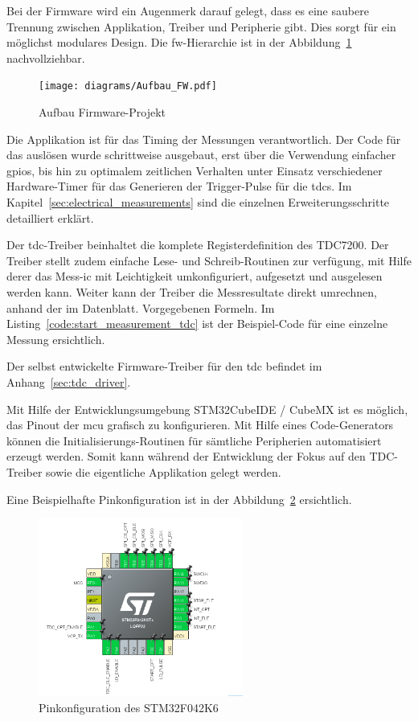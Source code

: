 Bei der Firmware wird ein Augenmerk darauf gelegt, dass es eine saubere Trennung zwischen Applikation, Treiber und
Peripherie gibt. Dies sorgt für ein möglichst modulares Design. Die \acrshort{fw}-Hierarchie ist in der
Abbildung~\ref{fig:hierarchy_firmware} nachvollziehbar.

\begin{figure}[H]
    \centering
    \texttt{[image: diagrams/Aufbau\_FW.pdf]}
    \caption{Aufbau Firmware-Projekt}\label{fig:hierarchy_firmware}
\end{figure}

Die Applikation ist für das Timing der Messungen verantwortlich. Der Code für das auslösen wurde schrittweise ausgebaut,
erst über die Verwendung einfacher \acrshort{gpio}s, bis hin zu optimalem zeitlichen Verhalten unter Einsatz verschiedener
Hardware-Timer für das Generieren der Trigger-Pulse für die \acrshort{tdc}s. Im Kapitel~\ref{sec:electrical_measurements}
sind die einzelnen Erweiterungsschritte detailliert erklärt.

Der \acrshort{tdc}-Treiber beinhaltet die komplete Registerdefinition des TDC7200. Der Treiber stellt zudem einfache Lese- und
Schreib-Routinen zur verfügung, mit Hilfe derer das Mess-\acrshort{ic} mit Leichtigkeit umkonfiguriert, aufgesetzt und
ausgelesen werden kann. Weiter kann der Treiber die Messresultate direkt umrechnen, anhand der im Datenblatt. Vorgegebenen
Formeln. Im Listing~\ref{code:start_measurement_tdc} ist der Beispiel-Code für eine einzelne Messung ersichtlich.



Der selbst entwickelte Firmware-Treiber für den \acrshort{tdc} befindet im Anhang~\ref{sec:tdc_driver}.

Mit Hilfe der Entwicklungsumgebung STM32CubeIDE / CubeMX ist es möglich, das Pinout der \acrshort{mcu} grafisch zu
konfigurieren. Mit Hilfe eines Code-Generators können die Initialisierungs-Routinen für sämtliche Peripherien automatisiert
erzeugt werden. Somit kann während der Entwicklung der Fokus auf den TDC-Treiber sowie die eigentliche Applikation gelegt
werden.

Eine Beispielhafte Pinkonfiguration ist in der Abbildung~\ref{fig:pinconfiguration_mcu} ersichtlich.

\begin{figure}[H]
    \centering
    \includegraphics[width=0.6\textwidth]{graphics/pinconfiguration_mcu.png}
    \caption{Pinkonfiguration des STM32F042K6}\label{fig:pinconfiguration_mcu}
\end{figure}



\pagebreak